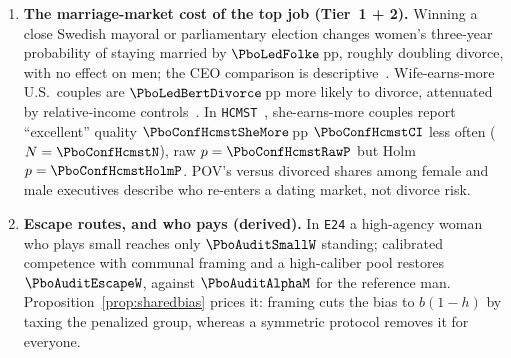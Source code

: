 \begin{enumerate}[leftmargin=1.4em,itemsep=1.5pt,topsep=2pt]
\item \textbf{The marriage-market cost of the top job (Tier~1 + 2).} Winning a close Swedish mayoral or parliamentary election changes women's three-year probability of staying married by $\PboLedFolke$\,pp, roughly doubling divorce, with no effect on men; the CEO comparison is descriptive~\cite{folke2020}. Wife-earns-more U.S.\ couples are $\PboLedBertDivorce$\,pp more likely to divorce, attenuated by relative-income controls~\cite{bertrand2015}. In \texttt{HCMST}~\cite{rosenfeld2019}, she-earns-more couples report ``excellent'' quality $\PboConfHcmstSheMore$\,pp $\PboConfHcmstCI$ less often ($N=\PboConfHcmstN$), raw $p=\PboConfHcmstRawP$ but Holm $p=\PboConfHcmstHolmP$. POV's \PboExecDivW{} versus \PboExecDivM{} divorced shares among female and male executives describe who re-enters a dating market, not divorce risk.
\item \textbf{Escape routes, and who pays (derived).} In \texttt{E24} a high-agency woman who plays small reaches only $\PboAuditSmallW$ standing; calibrated competence with communal framing and a high-caliber pool restores $\PboAuditEscapeW$, against $\PboAuditAlphaM$ for the reference man. Proposition~\ref{prop:sharedbias} prices it: framing cuts the bias to $b(1-h)$ by taxing the penalized group, whereas a symmetric protocol removes it for everyone.
\end{enumerate}

